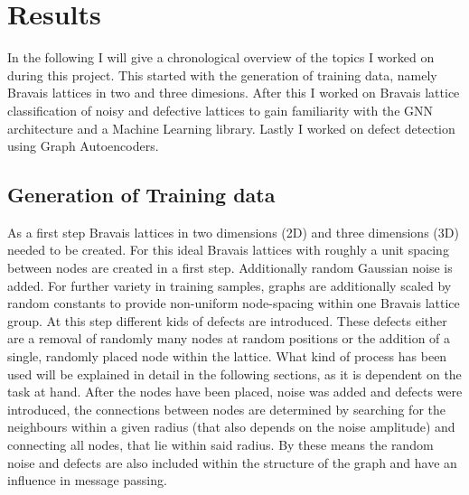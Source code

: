 \documentclass[11pt,a4paper]{article}
\begin{document}
\section{Results}
\label{sec:Results}
In the following I will give a chronological overview of the topics I worked on during this project. 
This started with the generation of training data, namely Bravais lattices in two and three dimesions. After this I worked on Bravais lattice classification of noisy and defective lattices to gain familiarity with the GNN architecture and a Machine Learning library. Lastly I worked on defect detection using Graph Autoencoders. 

\subsection{Generation of Training data}
\label{ssec:Generation of training data}
As a first step Bravais lattices in two dimensions (2D) and three dimensions (3D) needed to be created. 
For this ideal Bravais lattices with roughly a unit spacing between nodes are created in a first step. 
Additionally random Gaussian noise is added. 
For further variety in training samples, graphs are additionally scaled by random constants to provide non-uniform node-spacing within one Bravais lattice group. 
At this step different kids of defects are introduced. 
These defects either are a removal of randomly many nodes at random positions or the addition of a single, randomly placed node within the lattice. 
What kind of process has been used will be explained in detail in the following sections, as it is dependent on the task at hand. 
After the nodes have been placed, noise was added and defects were introduced, the connections between nodes are determined by searching for the neighbours within a given radius (that also depends on the noise amplitude) and connecting all nodes, that lie within said radius. 
By these means the random noise and defects are also included within the structure of the graph and have an influence in message passing. \\
\end{document}
